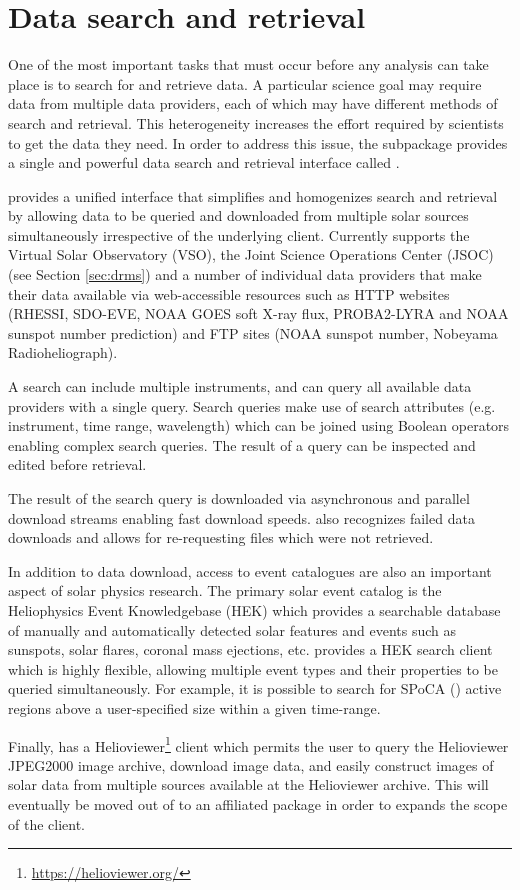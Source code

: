 \section{Data search and retrieval}
\label{sec:fido}

One of the most important tasks that must occur before any analysis can take place is to search for and retrieve data.
A particular science goal may require data from multiple data providers, each of which may have different methods of search and retrieval.
This heterogeneity increases the effort required by scientists to get the data they need.
In order to address this issue, the   subpackage provides a single and powerful data search and retrieval interface called \Fido.

\Fido provides a unified interface that simplifies and homogenizes search and retrieval by allowing data to be queried and downloaded from multiple solar sources simultaneously irrespective of the underlying client.
Currently \Fido supports the Virtual Solar Observatory (VSO), the Joint Science Operations Center (JSOC) (see Section \ref{sec:drms}) and a number of individual data providers that make their data available via web-accessible resources such as HTTP websites (RHESSI, SDO-EVE, NOAA GOES soft X-ray flux, PROBA2-LYRA and NOAA sunspot number prediction) and FTP sites (NOAA sunspot number, Nobeyama Radioheliograph).

A \Fido search can include multiple instruments, and can query all available data providers with a single query.
Search queries make use of search attributes (e.g. instrument, time range, wavelength) which can be joined using Boolean operators enabling complex search queries.
The result of a query can be inspected and edited before retrieval.

The result of the \Fido search query is downloaded via asynchronous and parallel download streams enabling fast download speeds.
\Fido also recognizes failed data downloads and allows for re-requesting files which were not retrieved.

In addition to data download, access to event catalogues are also an important aspect of solar physics research.
The primary solar event catalog is the Heliophysics Event Knowledgebase (HEK) which provides a searchable database of manually and automatically detected solar features and events such as sunspots, solar flares, coronal mass ejections, etc. \sunpypkg provides a HEK search client which is highly flexible, allowing multiple event types and their properties to be queried simultaneously.
For example, it is possible to search for SPoCA (\cite{2014AA...561A..29V}) active regions above a user-specified size within a given time-range.

Finally, \sunpypkg has a Helioviewer\footnote{\url{https://helioviewer.org/}} client which permits the user to query the Helioviewer JPEG2000 image archive, download image data, and easily construct images of solar data from multiple sources available at the Helioviewer archive.
This will eventually be moved out of \sunpypkg to an affiliated package in order to expands the scope of the client.
